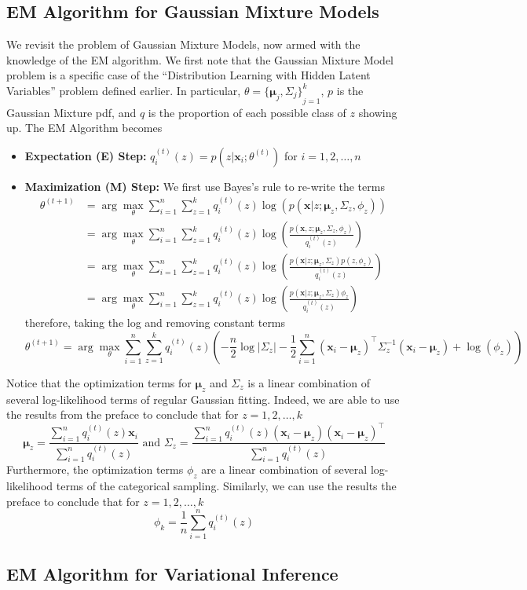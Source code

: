 \subsection{EM Algorithm for Gaussian Mixture Models}
We revisit the problem of Gaussian Mixture Models, now armed with the knowledge of the EM algorithm. We first note that the Gaussian Mixture Model problem is a specific case of the ``Distribution Learning with Hidden Latent Variables'' problem defined earlier. In particular, $\theta={\{\boldsymbol{\mu}_j,\Sigma_j\}}_{j=1}^k$, $p$ is the Gaussian Mixture pdf, and $q$ is the proportion of each possible class of $z$ showing up. The EM Algorithm becomes
\begin{itemize}
    \item \textbf{Expectation (E) Step:} $q_i^{(t)}(z)=p(z|\mathbf{x}_i;\theta^{(t)})$ for $i=1,2,\dots,n$
    \item \textbf{Maximization (M) Step:} We first use Bayes's rule to re-write the terms
    \begin{align*}
        \theta^{(t+1)} 
        &= \arg\max_{\theta} \sum_{i=1}^n \sum_{z=1}^k q_i^{(t)}(z) \log(p(\mathbf{x}|z;\boldsymbol{\mu}_z,\Sigma_z,\phi_z)) \\
        &= \arg\max_{\theta} \sum_{i=1}^n \sum_{z=1}^k q_i^{(t)}(z) \log\left(\frac{p(\mathbf{x},z;\boldsymbol{\mu}_z,\Sigma_z,\phi_z)}{q_i^{(t)}(z)}\right) \\
        &= \arg\max_{\theta} \sum_{i=1}^n \sum_{z=1}^k q_i^{(t)}(z) \log\left(\frac{p(\mathbf{x}|z;\boldsymbol{\mu}_z,\Sigma_z)p(z,\phi_z)}{q_i^{(t)}(z)}\right) \\
        &= \arg\max_{\theta} \sum_{i=1}^n \sum_{z=1}^k q_i^{(t)}(z) \log\left(\frac{p(\mathbf{x}|z;\boldsymbol{\mu}_z,\Sigma_z)\phi_z}{q_i^{(t)}(z)}\right)
    \end{align*}
    therefore, taking the log and removing constant terms
    \[
        \theta^{(t+1)} = \arg\max_{\theta} \sum_{i=1}^n \sum_{z=1}^k q_i^{(t)}(z) 
        \left(
            -\frac{n}{2} \log |\Sigma_z|
            - \frac{1}{2} \sum_{i=1}^n (\mathbf{x}_i - \boldsymbol{\mu}_z)^\top \Sigma_z^{-1} (\mathbf{x}_i - \boldsymbol{\mu}_z)
            + \log(\phi_z)
        \right)
    \]
\end{itemize}
Notice that the optimization terms for $\boldsymbol{\mu}_z$ and $\Sigma_z$ is a linear combination of several log-likelihood terms of regular Gaussian fitting. Indeed, we are able to use the results from the preface to conclude that for $z=1,2,\dots,k$
\[
\boldsymbol{\mu}_z = \frac{\sum_{i=1}^n q_i^{(t)}(z) \mathbf{x}_i}{\sum_{i=1}^n q_i^{(t)}(z)}
\text{ and }
\Sigma_z = \frac{\sum_{i=1}^n q_i^{(t)}(z) (\mathbf{x}_i-\boldsymbol{\mu}_z)(\mathbf{x}_i-\boldsymbol{\mu}_z)^\top}{\sum_{i=1}^n q_i^{(t)}(z)}
\]
Furthermore, the optimization terms $\phi_z$ are a linear combination of several log-likelihood terms of the categorical sampling. Similarly, we can use the results the preface to conclude that for $z=1,2,\dots,k$
\[
\phi_k = \frac{1}{n} \sum_{i=1}^n q_i^{(t)}(z)
\]
\subsection{EM Algorithm for Variational Inference}